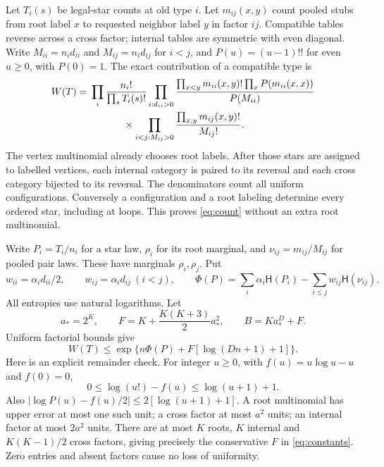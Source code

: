 \documentclass[11pt]{article}
\newcommand{\HH}{\mathsf H}
\begin{document}
Let $T_i(s)$ be legal-star counts at old type $i$. Let $m_{ij}(x,y)$
count pooled stubs from root label $x$ to requested neighbor label $y$
in factor $ij$. Compatible tables reverse across a cross factor;
internal tables are symmetric with even diagonal. Write
$M_{ii}=n_id_{ii}$ and $M_{ij}=n_id_{ij}$ for $i<j$, and
$P(u)=(u-1)!!$ for even $u\ge0$, with $P(0)=1$.
The exact contribution of a compatible type is
\begin{align}\label{eq:count}
 W(T)={}&\prod_i\frac{n_i!}{\prod_sT_i(s)!}
 \prod_{i:d_{ii}>0}
 \frac{\prod_{x<y}m_{ii}(x,y)!\prod_xP(m_{ii}(x,x))}{P(M_{ii})}
 \nonumber\\
 &\hspace{12mm}\times\prod_{i<j:M_{ij}>0}
        \frac{\prod_{x,y}m_{ij}(x,y)!}{M_{ij}!}.
\end{align}
The vertex multinomial already chooses root labels. After those stars
are assigned to labelled vertices, each internal category is paired to
its reversal and each cross category bijected to its reversal. The
denominators count all uniform configurations. Conversely a configuration
and a root labeling determine every ordered star, including at loops.
This proves \eqref{eq:count} without an extra root multinomial.

Write $P_i=T_i/n_i$ for a star law, $\rho_i$ for its root marginal,
and $\nu_{ij}=m_{ij}/M_{ij}$ for pooled pair laws. These have marginals
$\rho_i,\rho_j$. Put
\[
 w_{ii}=\alpha_id_{ii}/2,\qquad
 w_{ij}=\alpha_id_{ij}\ (i<j),\qquad
 \Phi(P)=\sum_i\alpha_i\HH(P_i)-\sum_{i\le j}w_{ij}\HH(\nu_{ij}).
\]
All entropies use natural logarithms. Let
\begin{equation}\label{eq:constants}
 a_*=2^K,\qquad F=K+\frac{K(K+3)}2a_*^2,
 \qquad B=Ka_*^D+F.
\end{equation}
Uniform factorial bounds give
\begin{equation}\label{eq:factorial}
 W(T)\le\exp\{n\Phi(P)+F[\log(Dn+1)+1]\}.
\end{equation}
Here is an explicit remainder check. For integer $u\ge0$, with
$f(u)=u\log u-u$ and $f(0)=0$,
\[
 0\le\log(u!)-f(u)\le\log(u+1)+1.
\]
Also $|\log P(u)-f(u)/2|\le2[\log(u+1)+1]$.
A root multinomial has upper error at most one such unit; a cross
factor at most $a^2$ units; an internal factor at most $2a^2$ units.
There are at most $K$ roots, $K$ internal and $K(K-1)/2$ cross factors,
giving precisely the conservative $F$ in \eqref{eq:constants}.
Zero entries and absent factors cause no loss of uniformity.
\end{document}

